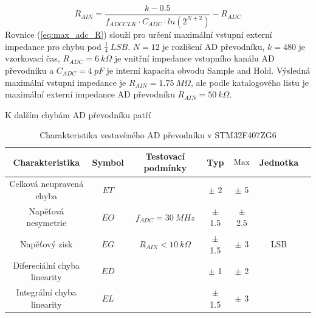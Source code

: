 \begin{equation} \label{eq:max_adc_R}
    R_{AIN} = \frac{k - 0.5}{f_{ADCCLK} \cdot C_{ADC} \cdot ln(2^{N+2})} - R_{ADC}
\end{equation}
Rovnice (\ref{eq:max_adc_R}) slouží pro určení maximální vstupní externí impedance pro chybu pod $\frac{1}{4} \ LSB$. $N = 12$ je rozlišení AD převodníku, $k = 480$ je vzorkovací čas, $R_{ADC} = 6 \ k\Omega$ je vnitřní impedance vstupního kanálu AD převodníku a
$C_{ADC} = 4 \ pF$ je interní kapacita obvodu Sample and Hold. Výsledná maximální vstupní impedance je $R_{AIN} = 1.75 \ M\Omega$, ale podle katalogového listu je maximální externí impedance AD převodníku $R_{AIN} = 50 \ k\Omega$.
\par
K dalším chybám AD převodníku patří

\begin{table}[H]
    \label{tab:stm_adc_error}
    \caption{Charakteristika vestavěného AD převodníku v STM32F407ZG6}
    \hspace*{-1.3cm}
    \begin{ctucolortab}
        \begin{tabular}{ccccccc}
            \toprule
            Charakteristika               & Symbol & Testovací podmínky       & Typ       & $\textnormal{Max}$ & Jednotka & \\ \midrule
            Celková neupravená chyba      & $ET$   &                          & $\pm$ 2   & $\pm$ 5            &          & \\
            Napěťová nesymetrie           & $EO$   & $f_{ADC} = 30 \ MHz$     & $\pm$ 1.5 & $\pm$ 2.5          &          & \\
            Napěťový zisk                 & $EG$   & $R_{AIN} < 10 \ k\Omega$ & $\pm$ 1.5 & $\pm$ 3            & LSB      & \\
            Difereciální  chyba linearity & $ED$   &                          & $\pm$ 1   & $\pm$ 2            &          & \\
            Integrální chyba linearity    & $EL$   &                          & $\pm$ 1.5 & $\pm$ 3            &          & \\
            \bottomrule
        \end{tabular}
    \end{ctucolortab}
\end{table}

